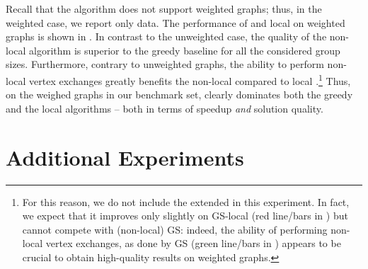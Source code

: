 Recall that the \localswaps algorithm does not support weighted graphs; thus,
in the weighted case, we report only \growshrink data.
The performance of \growshrink and local \growshrink on weighted graphs is
shown in . In contrast to the unweighted case,
the quality of the non-local \growshrink algorithm is superior to the greedy
baseline for all the considered group sizes. Furthermore, contrary to
unweighted graphs, the ability to perform non-local vertex exchanges greatly
benefits the non-local \growshrink compared to local \growshrink.\footnote{For
this reason, we do not include the extended \growshrink in this experiment.
In fact, we expect that it improves only slightly on GS-local (red line/bars
in ) but cannot compete with (non-local) GS:
indeed, the ability of performing non-local vertex exchanges, as done by
GS (green line/bars in ) appears to be
crucial to obtain high-quality results on weighted graphs.}
%
Thus, on the weighed graphs in our benchmark set, \growshrink clearly dominates
both the greedy and the local \growshrink algorithms -- both in terms of speedup
\emph{and} solution quality.


\section{Additional Experiments}

